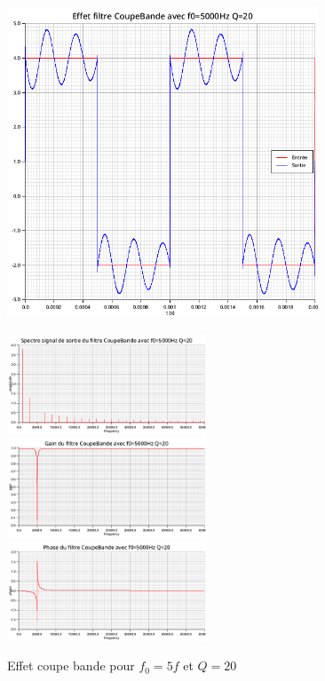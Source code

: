 \documentclass{article}
\begin{document}
\begin{figure}[H]
  \begin{minipage}{0.6\textwidth}
      \centering
      \includegraphics[width=25em]{images/creneau/rejecteur/q=20/5/signals.png}
  \end{minipage}
  \begin{minipage}{0.3\textwidth}
      \centering
      \includegraphics[width=16em]{images/creneau/rejecteur/q=20/5/fft_out.png}
      \vfill
      \includegraphics[width=16em]{images/creneau/rejecteur/q=20/5/gain.png}
      \vfill
      \includegraphics[width=16em]{images/creneau/rejecteur/q=20/5/phase.png}
  \end{minipage}
  \caption{Effet coupe bande pour $f_0=5f$ et $Q=20$}
\end{figure}
\end{document}
